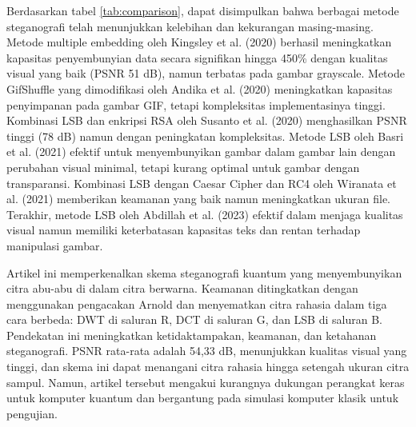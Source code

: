 \documentclass{ittelkom}
\begin{document}
{    Berdasarkan tabel \ref{tab:comparison}, dapat disimpulkan bahwa berbagai metode
    steganografi telah menunjukkan kelebihan dan kekurangan masing-masing. Metode
    multiple embedding oleh Kingsley et al. (2020) berhasil meningkatkan kapasitas
    penyembunyian data secara signifikan hingga 450\% dengan kualitas visual yang
    baik (PSNR 51 dB), namun terbatas pada gambar grayscale. Metode GifShuffle yang
    dimodifikasi oleh Andika et al. (2020) meningkatkan kapasitas penyimpanan pada
    gambar GIF, tetapi kompleksitas implementasinya tinggi. Kombinasi LSB dan
    enkripsi RSA oleh Susanto et al. (2020) menghasilkan PSNR tinggi (78 dB) namun
    dengan peningkatan kompleksitas. Metode LSB oleh Basri et al. (2021) efektif
    untuk menyembunyikan gambar dalam gambar lain dengan perubahan visual minimal,
    tetapi kurang optimal untuk gambar dengan transparansi. Kombinasi LSB dengan
    Caesar Cipher dan RC4 oleh Wiranata et al. (2021) memberikan keamanan yang baik
    namun meningkatkan ukuran file. Terakhir, metode LSB oleh Abdillah et al.
    (2023) efektif dalam menjaga kualitas visual namun memiliki keterbatasan
    kapasitas teks dan rentan terhadap manipulasi gambar.

    Artikel ini memperkenalkan skema steganografi kuantum yang menyembunyikan citra
    abu-abu di dalam citra berwarna. Keamanan ditingkatkan dengan menggunakan
    pengacakan Arnold dan menyematkan citra rahasia dalam tiga cara berbeda: DWT di
    saluran R, DCT di saluran G, dan LSB di saluran B. Pendekatan ini meningkatkan
    ketidaktampakan, keamanan, dan ketahanan steganografi. PSNR rata-rata adalah
    54,33 dB, menunjukkan kualitas visual yang tinggi, dan skema ini dapat
    menangani citra rahasia hingga setengah ukuran citra sampul. Namun, artikel
    tersebut mengakui kurangnya dukungan perangkat keras untuk komputer kuantum dan
    bergantung pada simulasi komputer klasik untuk pengujian.\cite{dong2024new}

}
\end{document}
